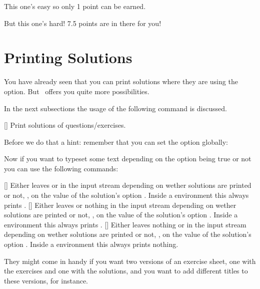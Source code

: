 \documentclass[load-preamble+]{cnltx-doc}
\begin{document}
\begin{example}[add-sourcecode-options={literate=}]
  \begin{question}{1}
    This one's easy so only 1 point can be earned.
  \end{question}
  \begin{question}{7.5}
    But this one's hard! 7.5 points are in there for you!
  \end{question}
\end{example}

\section{Printing Solutions}\label{sec:solutions}
You have already seen that you can print solutions where they are using the
 option.  But \ExSheets\ offers you quite more
possibilities.

In the next subsections the usage of the following command is discussed.
\begin{commands}
  []
    Print solutions of questions/exercises.
\end{commands}

Before we do that a hint: remember that you can set the option 
globally:
\begin{sourcecode}
\end{sourcecode}

Now if you want to typeset some text depending on the option being true or not
you can use the following commands:
\begin{commands}
  \expandable{}[]
    Either leaves  or  in the input stream
    depending on wether solutions are printed or not, \ie, on the value of the
    solution's option .  Inside a  environment
    this always prints .
  \expandable{}[]
    Either leaves  or nothing in the input stream depending on
    wether solutions are printed or not, \ie, on the value of the solution's
    option .  Inside a  environment this always
    prints .
  \expandable{}[]
    Either leaves nothing or  in the input stream depending
    on wether solutions are printed or not, \ie, on the value of the
    solution's option .  Inside a environment this
    always prints nothing.
\end{commands}
They might come in handy if you want two versions of an exercise sheet, one
with the exercises and one with the solutions, and you want to add different
titles to these versions, for instance.
\end{document}
